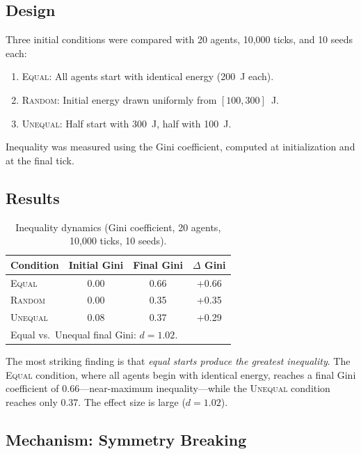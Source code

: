 \documentclass[12pt,a4paper]{article}
\begin{document}
\subsection{Design}

Three initial conditions were compared with 20 agents, 10{,}000 ticks, and 10 seeds each:

\begin{enumerate}
\item \textsc{Equal}: All agents start with identical energy (200~J each).
\item \textsc{Random}: Initial energy drawn uniformly from $[100, 300]$~J.
\item \textsc{Unequal}: Half start with 300~J, half with 100~J.
\end{enumerate}

Inequality was measured using the Gini coefficient, computed at initialization and at the final tick.

\subsection{Results}

\begin{table}[H]
\centering
\caption{Inequality dynamics (Gini coefficient, 20 agents, 10{,}000 ticks, 10 seeds).}
\label{tab:inequality}
\begin{tabular}{@{}lccc@{}}
\toprule
\textbf{Condition} & \textbf{Initial Gini} & \textbf{Final Gini} & \textbf{$\Delta$ Gini} \\
\midrule
\textsc{Equal}   & 0.00 & 0.66 & +0.66 \\
\textsc{Random}  & 0.00 & 0.35 & +0.35 \\
\textsc{Unequal} & 0.08 & 0.37 & +0.29 \\
\bottomrule
\multicolumn{4}{l}{\small Equal vs.\ Unequal final Gini: $d = 1.02$.}
\end{tabular}
\end{table}

The most striking finding is that \emph{equal starts produce the greatest inequality}. The \textsc{Equal} condition, where all agents begin with identical energy, reaches a final Gini coefficient of 0.66---near-maximum inequality---while the \textsc{Unequal} condition reaches only 0.37. The effect size is large ($d = 1.02$).

\subsection{Mechanism: Symmetry Breaking}
\end{document}
